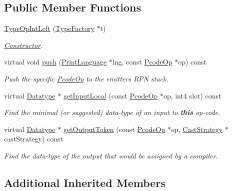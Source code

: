 \subsection*{Public Member Functions}
\begin{DoxyCompactItemize}
\item 
\mbox{\hyperlink{class_type_op_int_left_ae5588fc066e2cad01eec97d484545f0c}{Type\+Op\+Int\+Left}} (\mbox{\hyperlink{class_type_factory}{Type\+Factory}} $\ast$t)
\begin{DoxyCompactList}\small\item\em \mbox{\hyperlink{class_constructor}{Constructor}}. \end{DoxyCompactList}\item 
virtual void \mbox{\hyperlink{class_type_op_int_left_a4451bade27542ad853dbb21bb26f1191}{push}} (\mbox{\hyperlink{class_print_language}{Print\+Language}} $\ast$lng, const \mbox{\hyperlink{class_pcode_op}{Pcode\+Op}} $\ast$op) const
\begin{DoxyCompactList}\small\item\em Push the specific \mbox{\hyperlink{class_pcode_op}{Pcode\+Op}} to the emitter\textquotesingle{}s R\+PN stack. \end{DoxyCompactList}\item 
virtual \mbox{\hyperlink{class_datatype}{Datatype}} $\ast$ \mbox{\hyperlink{class_type_op_int_left_ace4697dce938154ffc5098b0c582cf3b}{get\+Input\+Local}} (const \mbox{\hyperlink{class_pcode_op}{Pcode\+Op}} $\ast$op, int4 slot) const
\begin{DoxyCompactList}\small\item\em Find the minimal (or suggested) data-\/type of an input to {\bfseries{this}} op-\/code. \end{DoxyCompactList}\item 
virtual \mbox{\hyperlink{class_datatype}{Datatype}} $\ast$ \mbox{\hyperlink{class_type_op_int_left_a0c99823cd347ae28c3608a3f02fdda09}{get\+Output\+Token}} (const \mbox{\hyperlink{class_pcode_op}{Pcode\+Op}} $\ast$op, \mbox{\hyperlink{class_cast_strategy}{Cast\+Strategy}} $\ast$cast\+Strategy) const
\begin{DoxyCompactList}\small\item\em Find the data-\/type of the output that would be assigned by a compiler. \end{DoxyCompactList}\end{DoxyCompactItemize}
\subsection*{Additional Inherited Members}


